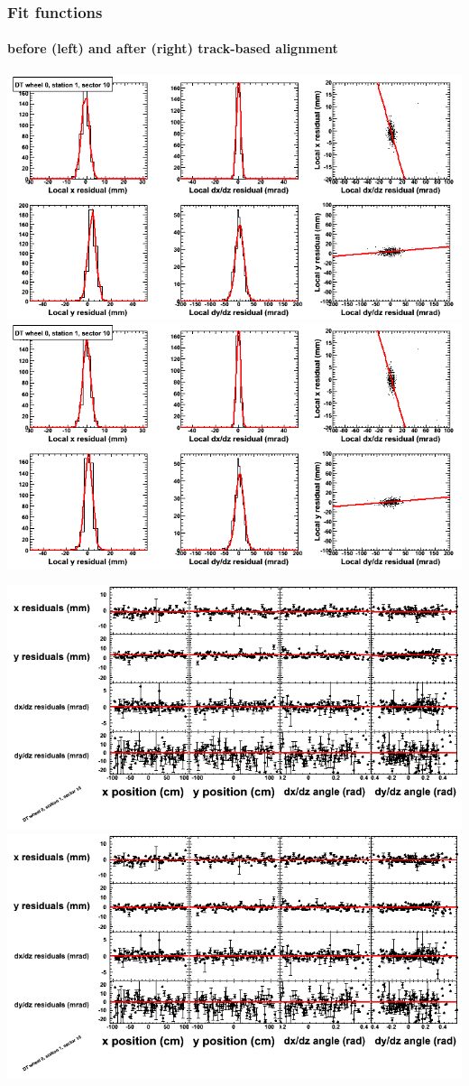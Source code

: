 \documentclass[compress]{beamer}
\begin{document}
\begin{frame}
\frametitle{Fit functions}
\framesubtitle{before (left) and after (right) track-based alignment}
\includegraphics[width=0.5\linewidth]{fitfunctions_re01/MBwhCst1sec10_bellcurves.png} \includegraphics[width=0.5\linewidth]{fitfunctions_re05/MBwhCst1sec10_bellcurves.png}

\includegraphics[width=0.5\linewidth]{fitfunctions_re01/MBwhCst1sec10_polynomials.png} \includegraphics[width=0.5\linewidth]{fitfunctions_re05/MBwhCst1sec10_polynomials.png}
\end{frame}
\end{document}
